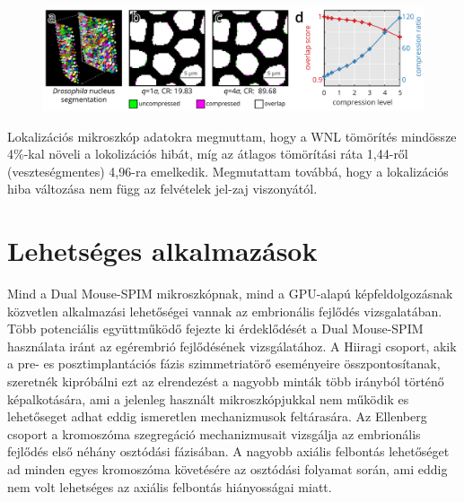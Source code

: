 \documentclass{booklet_style}
\begin{document}
    \begin{figure}
      \centering
      \includegraphics[page=1,width=\textwidth]{4_gpu/LLvsB3D}
      \label{fig:wnlDroso}
    \end{figure}

    Lokalizációs mikroszkóp adatokra megmuttam, hogy a WNL tömörítés mindössze 4\%-kal növeli a lokolizációs hibát, míg az átlagos tömörítási ráta 1,44-ről (veszteségmentes) 4,96-ra emelkedik. Megmutattam továbbá, hogy a lokalizációs hiba változása nem függ az felvételek jel-zaj viszonyától.

    


\section{Lehetséges alkalmazások}
Mind a Dual Mouse-SPIM mikroszkópnak, mind a GPU-alapú képfeldolgozásnak közvetlen alkalmazási lehetőségei vannak az embrionális fejlődés vizsgalatában. Több potenciális együttműködő fejezte ki érdeklődését a Dual Mouse-SPIM használata iránt az egérembrió fejlődésének vizsgálatához. A Hiiragi
csoport, akik a pre- es posztimplantációs fázis szimmetriatörő eseményeire összpontosítanak, szeretnék kipróbálni ezt az elrendezést a nagyobb minták több irányból történő képalkotására, ami a jelenleg használt mikroszkópjukkal nem működik es lehetőseget adhat eddig ismeretlen mechanizmusok feltárasára. Az Ellenberg csoport a kromoszóma szegregáció mechanizmusait vizsgálja az embrionális fejlődés első néhány osztódási fázisában. A nagyobb axiális felbontás lehetőséget ad minden egyes kromoszóma követésére az osztódási folyamat során, ami eddig nem volt lehetséges az axiális felbontás hiányosságai miatt.
\end{document}
